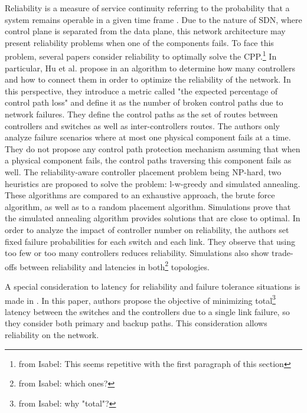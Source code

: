 \documentclass{IEEEtran}
\newcommand\fia[1]{{\color{red}\footnote{\color{red}from Isabel: #1}}} %
\begin{document}
Reliability is a measure of service continuity referring to the probability that a system remains operable in a given time frame \cite{Rak15}. Due to the nature of SDN, where control plane is separated from the data plane, this network architecture may present reliability problems when one of the components fails. To face this problem, several papers consider reliability to optimally solve the CPP.\fia{This seems repetitive with the first paragraph of this section } In particular, Hu et al. propose in \cite{HuWa12,HuWe13} an algorithm to determine how many controllers and how to connect them in order to optimize the reliability of the network. In this perspective, they introduce a metric called "the expected percentage of control path loss" and define it  as the number of broken control paths due to network failures. They define the control paths as the set of routes between controllers and switches as well as inter-controllers routes. The authors only analyze failure scenarios where at most one physical component fails at a time. They do not propose any control path protection mechanism assuming that when a physical component fails, the control paths traversing this component fails as well. The reliability-aware controller placement problem being NP-hard, two heuristics are proposed to solve the problem: l-w-greedy and simulated annealing. These algorithms are compared to an exhaustive approach, the brute force algorithm, as well as to a random placement algorithm. Simulations prove that the simulated annealing algorithm provides solutions that are close to optimal. In order to analyze the impact of controller number on reliability, the authors set fixed failure probabilities for each switch and each link. They observe that using too few or too many controllers reduces reliability. Simulations also show trade-offs between reliability and latencies in both\fia{which ones?} topologies.

A special consideration to latency for reliability and failure tolerance situations is made in \cite{FaXi18}. In this paper, authors propose the objective of minimizing total\fia{why "total"?} latency between the switches and the controllers due to a single link failure, so they consider both primary and backup paths. This consideration allows reliability on the network. %
\end{document}
